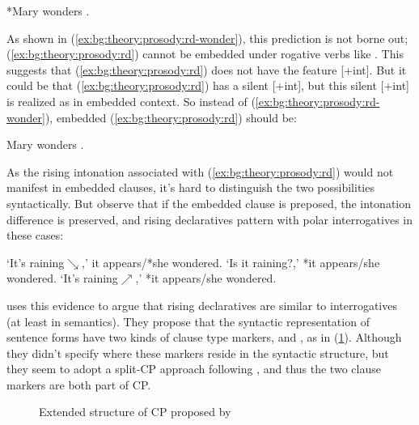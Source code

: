 *Mary wonders .
\eex

As shown in (\ref{ex:bg:theory:prosody:rd-wonder}), this prediction is not borne out; (\ref{ex:bg:theory:prosody:rd}) cannot be embedded under rogative verbs like . This suggests that (\ref{ex:bg:theory:prosody:rd}) does not have the feature [+int]. But it could be that (\ref{ex:bg:theory:prosody:rd}) has a silent [+int], but this silent [+int] is realized as  in embedded context. So instead of (\ref{ex:bg:theory:prosody:rd-wonder}), embedded (\ref{ex:bg:theory:prosody:rd}) should be:

Mary wonders .
\eex

As the rising intonation associated with (\ref{ex:bg:theory:prosody:rd}) would not manifest in embedded clauses, it's hard to distinguish the two possibilities syntactically. But \textcite{farkasroelofsen2017} observe that if the embedded clause is preposed, the intonation difference is preserved, and rising declaratives pattern with polar interrogatives in these cases:

\bxl{}
`It's raining$\searrow$,' it appears/*she wondered.
\ex`Is it raining?,' *it appears/she wondered.
\ex`It's raining$\nearrow$,' *it appears/she wondered.
\exl
\eex

\textcite{farkasroelofsen2017} uses this evidence to argue that rising declaratives are similar to interrogatives (at least in semantics). They propose that the syntactic representation of sentence forms have two kinds of clause type markers,  and , as in (\ref{fig:bg:fb2017}). Although they didn't specify where these markers reside in the syntactic structure, but they seem to adopt a split-CP approach following \textcite{rizzi1997}, and thus the two clause markers are both part of CP. 


\begin{figure}[H]
\begin{center}
\end{center}
\caption{Extended structure of CP proposed by \textcite{farkasroelofsen2017}}
\label{fig:bg:fb2017}
\end{figure}


